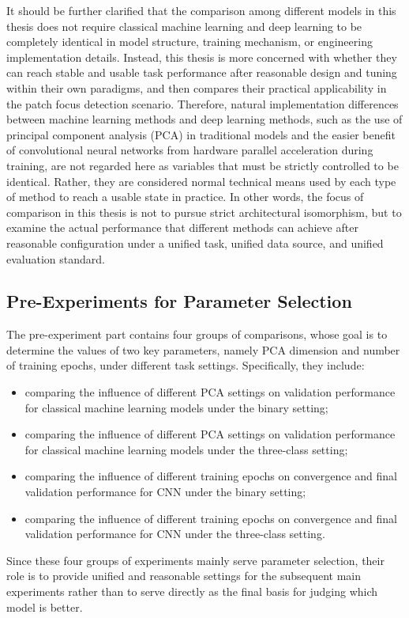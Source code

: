 \par It should be further clarified that the comparison among different models
in this thesis does not require classical machine learning and deep learning to
be completely identical in model structure, training mechanism, or engineering
implementation details. Instead, this thesis is more concerned with whether
they can reach stable and usable task performance after reasonable design and
tuning within their own paradigms, and then compares their practical
applicability in the patch focus detection scenario. Therefore, natural
implementation differences between machine learning methods and deep learning
methods, such as the use of principal component analysis (PCA) in traditional
models and the easier benefit of convolutional neural networks from hardware
parallel acceleration during training, are not regarded here as variables that
must be strictly controlled to be identical. Rather, they are considered normal
technical means used by each type of method to reach a usable state in
practice. In other words, the focus of comparison in this thesis is not to
pursue strict architectural isomorphism, but to examine the actual performance
that different methods can achieve after reasonable configuration under a
unified task, unified data source, and unified evaluation standard.

\subsection{Pre-Experiments for Parameter Selection}
\par The pre-experiment part contains four groups of comparisons, whose goal is
to determine the values of two key parameters, namely PCA dimension and number
of training epochs, under different task settings. Specifically, they include:
\begin{itemize}
    \item comparing the influence of different PCA settings on validation
    performance for classical machine learning models under the binary setting;
    \item comparing the influence of different PCA settings on validation
    performance for classical machine learning models under the three-class
    setting;
    \item comparing the influence of different training epochs on convergence
    and final validation performance for CNN under the binary setting;
    \item comparing the influence of different training epochs on convergence
    and final validation performance for CNN under the three-class setting.
\end{itemize}
\par Since these four groups of experiments mainly serve parameter selection,
their role is to provide unified and reasonable settings for the subsequent
main experiments rather than to serve directly as the final basis for judging
which model is better.

